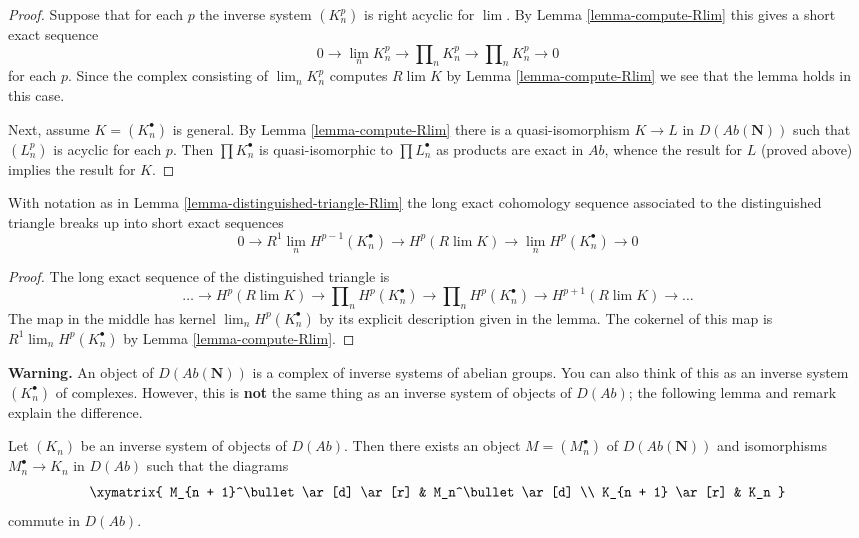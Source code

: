 \begin{proof}
Suppose that for each $p$ the inverse system $(K_n^p)$ is right
acyclic for $\lim$. By Lemma \ref{lemma-compute-Rlim}
this gives a short exact sequence
$$
0 \to \lim_n K^p_n \to \prod\nolimits_n K^p_n \to \prod\nolimits_n K^p_n \to 0
$$
for each $p$. Since the complex consisting of $\lim_n K^p_n$
computes $R\lim K$ by Lemma \ref{lemma-compute-Rlim} we see that the
lemma holds in this case.

\medskip\noindent
Next, assume $K = (K_n^\bullet)$ is general. By Lemma \ref{lemma-compute-Rlim}
there is a quasi-isomorphism $K \to L$ in $D(\textit{Ab}(\mathbf{N}))$
such that $(L_n^p)$ is acyclic for each $p$. Then $\prod K_n^\bullet$
is quasi-isomorphic to $\prod L_n^\bullet$ as products are exact in
$\textit{Ab}$, whence the result for $L$ (proved above) implies the
result for $K$.
\end{proof}

\begin{lemma}
\label{lemma-break-long-exact-sequence}
With notation as in Lemma \ref{lemma-distinguished-triangle-Rlim}
the long exact cohomology sequence associated to the distinguished
triangle breaks up into short exact sequences
$$
0 \to R^1\lim_n H^{p - 1}(K_n^\bullet) \to
H^p(R\lim K) \to
\lim_n H^p(K_n^\bullet) \to 0
$$
\end{lemma}

\begin{proof}
The long exact sequence of the distinguished triangle is
$$
\ldots \to H^p(R\lim K) \to \prod\nolimits_n H^p(K_n^\bullet)
\to \prod\nolimits_n H^p(K_n^\bullet) \to
H^{p + 1}(R\lim K) \to \ldots
$$
The map in the middle has kernel $\lim_n H^p(K_n^\bullet)$ by its
explicit description given in the lemma.
The cokernel of this map is $R^1\lim_n H^p(K_n^\bullet)$
by Lemma \ref{lemma-compute-Rlim}.
\end{proof}

\noindent
{\bf Warning.} An object of $D(\textit{Ab}(\mathbf{N}))$ is a complex of
inverse systems of abelian groups. You can also think of this as an inverse
system $(K_n^\bullet)$ of complexes. However, this is {\bf not} the
same thing as an inverse system of objects of $D(\textit{Ab})$; the following
lemma and remark explain the difference.

\begin{lemma}
\label{lemma-lift-to-system-complexes-Ab}
Let $(K_n)$ be an inverse system of objects of $D(\textit{Ab})$.
Then there exists an object $M = (M_n^\bullet)$
of $D(\textit{Ab}(\mathbf{N}))$ and isomorphisms
$M_n^\bullet \to K_n$ in $D(\textit{Ab})$ such that the diagrams
$$
\xymatrix{
M_{n + 1}^\bullet \ar[d] \ar[r] &
M_n^\bullet \ar[d] \\
K_{n + 1} \ar[r] & K_n
}
$$
commute in $D(\textit{Ab})$.
\end{lemma}

